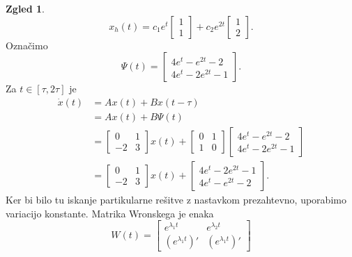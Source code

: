 \documentclass[12pt,a4paper]{amsart}
\theoremstyle{definition} %
\newtheorem{zgled}[definicija]{Zgled}
\theoremstyle{plain} %
\begin{document}
\begin{zgled}
    \[ x_h(t)=c_1e^t\begin{bmatrix}
        1 \\
        1 
    \end{bmatrix}
    +c_2e^{2t}\begin{bmatrix}
        1 \\
        2 
    \end{bmatrix}.\]
    Označimo
    \[\Psi(t)=\begin{bmatrix}
        4e^{t}-e^{2t}-2  \\
        4e^{t}-2e^{2t}-1  
    \end{bmatrix}.\]
    Za $t\in[\tau,2\tau]$ je
    \begin{equation*}
        \begin{split}
            \dot{x}(t) &= Ax(t)+Bx(t-\tau) \\
            &= Ax(t)+B\Psi(t) \\
            &= \begin{bmatrix}
                0 & 1 \\
                -2 & 3 
            \end{bmatrix}x(t)+\begin{bmatrix}
                0 & 1 \\
                1 & 0 
            \end{bmatrix}
            \begin{bmatrix}
                4e^{t}-e^{2t}-2  \\
                4e^{t}-2e^{2t}-1  
            \end{bmatrix} \\
            &= \begin{bmatrix}
                0 & 1 \\
                -2 & 3 
            \end{bmatrix}x(t)+
            \begin{bmatrix}
                4e^{t}-2e^{2t}-1  \\
                4e^{t}-e^{2t}-2  
            \end{bmatrix}.
        \end{split}
    \end{equation*}
    Ker bi bilo tu iskanje partikularne rešitve z nastavkom prezahtevno, uporabimo variacijo konstante.
    Matrika Wronskega je enaka
    \[W(t)=\begin{bmatrix}
        e^{\lambda_1t} & e^{\lambda_2t} \\
        (e^{\lambda_1t})' & (e^{\lambda_1t})' 

\end{bmatrix}\]
\end{zgled}
\end{document}
